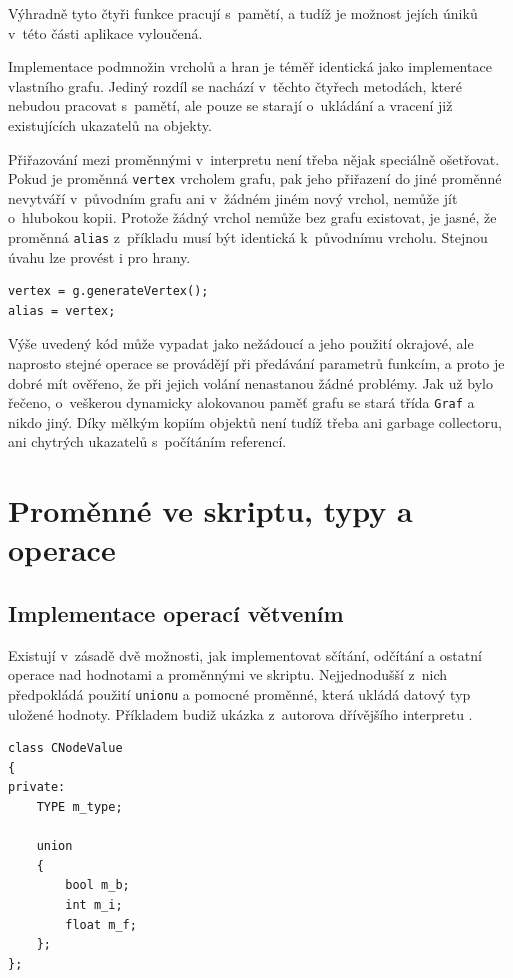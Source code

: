 \documentclass[11pt,twoside,a4paper]{book}
\begin{document}
Výhradně tyto čtyři funkce pracují s~pamětí, a tudíž je možnost jejích úniků v~této části aplikace vyloučená.

Implementace podmnožin vrcholů a hran je téměř identická jako implementace vlastního grafu. Jediný rozdíl se nachází v~těchto čtyřech metodách, které nebudou pracovat s~pamětí, ale pouze se starají o~ukládání a vracení již existujících ukazatelů na objekty.

Přiřazování mezi proměnnými v~interpretu není třeba nějak speciálně ošetřovat. Pokud je proměnná \texttt{vertex} vrcholem grafu, pak jeho přiřazení do jiné proměnné nevytváří v~původním grafu ani v~žádném jiném nový vrchol, nemůže jít o~hlubokou kopii. Protože žádný vrchol nemůže bez grafu existovat, je jasné, že proměnná \texttt{alias} z~příkladu musí být identická k~původnímu vrcholu. Stejnou úvahu lze provést i pro hrany.

\begin{verbatim}
vertex = g.generateVertex();
alias = vertex;
\end{verbatim}

Výše uvedený kód může vypadat jako nežádoucí a jeho použití okrajové, ale naprosto stejné operace se provádějí při předávání parametrů funkcím, a proto je dobré mít ověřeno, že při jejich volání nenastanou žádné problémy. Jak už bylo řečeno, o~veškerou dynamicky alokovanou paměť grafu se stará třída \texttt{Graf} a nikdo jiný. Díky mělkým kopiím objektů není tudíž třeba ani garbage collectoru, ani chytrých ukazatelů s~počítáním referencí.


\section{Proměnné ve skriptu, typy a operace}

\subsection{Implementace operací větvením}

Existují v~zásadě dvě možnosti, jak implementovat sčítání, odčítání a ostatní operace nad hodnotami a proměnnými ve skriptu. Nejjednodušší z~nich předpokládá použití \texttt{unionu} a pomocné proměnné, která ukládá datový typ uložené hodnoty. Příkladem budiž ukázka z~autorova dřívějšího interpretu \cite[třída \texttt{CNodeValue}]{borsch}.

\begin{verbatim}
class CNodeValue
{
private:
    TYPE m_type;

    union
    {
        bool m_b;
        int m_i;
        float m_f;
    };
};
\end{verbatim}
\end{document}
